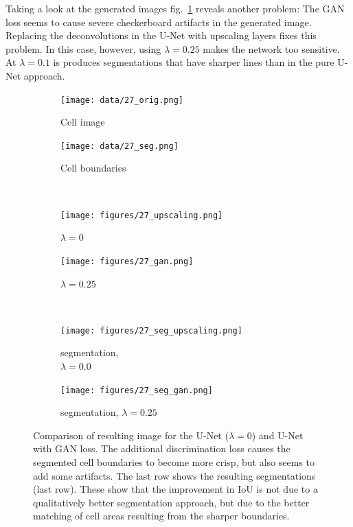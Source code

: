\documentclass[aps,prl,twocolumn,groupedaddress,amsmath,amssymb]{revtex4-1}
\begin{document}
    Taking a look at the generated images fig.~\ref{fig:unet_vs_ganunet} reveals another problem: 
    The GAN loss seems to cause severe checkerboard artifacts in the generated image. Replacing the
    deconvolutions in the U-Net with upscaling layers fixes this problem. In this case, however, 
    using $\lambda=0.25$ makes the network too sensitive. At $\lambda=0.1$ is produces segmentations
    that have sharper lines than in the pure U-Net approach.

    \begin{figure}[tbp]
        \begin{subfigure}[c]{0.45\linewidth}
            \texttt{[image: data/27\_orig.png]}
            \caption{Cell image}
        \end{subfigure} %
        \begin{subfigure}[c]{0.45\linewidth}
            \texttt{[image: data/27\_seg.png]}
            \caption{Cell boundaries}
        \end{subfigure} \\
        \begin{subfigure}[c]{0.45\linewidth}
            \texttt{[image: figures/27\_upscaling.png]}
            \caption{$\lambda=0$}
        \end{subfigure}%
        \begin{subfigure}[c]{0.45\linewidth}
            \texttt{[image: figures/27\_gan.png]}
            \caption{$\lambda=0.25$}
        \end{subfigure}\\
        \begin{subfigure}[c]{0.45\linewidth}
            \texttt{[image: figures/27\_seg\_upscaling.png]}
            \caption{segmentation, \\ $\lambda=0.0$}
        \end{subfigure}%
        \begin{subfigure}[c]{0.45\linewidth}
            \texttt{[image: figures/27\_seg\_gan.png]}
            \caption{segmentation, $\lambda=0.25$}
        \end{subfigure}
        \caption{Comparison of resulting image for the U-Net ($\lambda=0$) and U-Net with GAN loss.
         The additional discrimination loss causes the segmented cell boundaries
        to become more crisp, but also seems to add some artifacts.
        The last row shows the resulting segmentations (last row). These show that the improvement 
        in IoU is not due to a qualitatively better segmentation approach, but due to the better 
        matching of cell areas resulting from the sharper boundaries.}
        \label{fig:unet_vs_ganunet}
    \end{figure}
\end{document}
